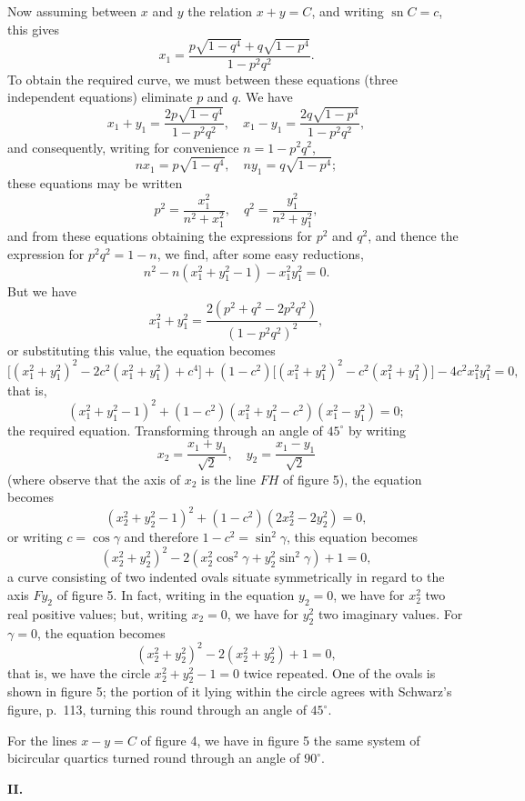 \documentclass[11pt,a4paper]{book}
\begin{document}
{{{Now assuming between $x$ and $y$ the relation $x + y = C$, and writing $\operatorname{sn} C = c$, this gives
\[
x_1 = \frac{p\sqrt{1-q^4} + q\sqrt{1-p^4}}{1-p^2q^2}.
\]
To obtain the required curve, we must between these equations (three independent
equations) eliminate $p$ and $q$. We have
\[
x_1 + y_1 = \frac{2p\sqrt{1-q^4}}{1-p^2q^2},
\quad
x_1 - y_1 = \frac{2q\sqrt{1-p^4}}{1-p^2q^2},
\]
and consequently, writing for convenience $n = 1 - p^2q^2$,
\[
nx_1 = p\sqrt{1-q^4}, \quad ny_1 = q\sqrt{1-p^4};
\]
these equations may be written
\[
p^2 = \frac{x_1^2}{n^2 + x_1^2}, \quad q^2 = \frac{y_1^2}{n^2 + y_1^2},
\]
and from these equations obtaining the expressions for $p^2$ and $q^2$, and thence the
expression for $p^2q^2 = 1 - n$, we find, after some easy reductions,
\[
n^2 - n(x_1^2 + y_1^2 - 1) - x_1^2y_1^2 = 0.
\]
But we have
\[
x_1^2 + y_1^2 = \frac{2(p^2 + q^2 - 2p^2q^2)}{(1-p^2q^2)^2},
\]
or substituting this value, the equation becomes
\[
\bigl[(x_1^2 + y_1^2)^2 - 2c^2(x_1^2 + y_1^2) + c^4\bigr] + (1-c^2)\bigl[(x_1^2 + y_1^2)^2 - c^2(x_1^2 + y_1^2)\bigr] - 4c^2x_1^2y_1^2 = 0,
\]
that is,
\[
(x_1^2 + y_1^2 - 1)^2 + (1-c^2)(x_1^2 + y_1^2 - c^2)(x_1^2 - y_1^2) = 0;
\]
the required equation. Transforming through an angle of $45^\circ$ by writing
\[
x_2 = \frac{x_1 + y_1}{\sqrt{2}}, \quad y_2 = \frac{x_1 - y_1}{\sqrt{2}}
\]
(where observe that the axis of $x_2$ is the line $FH$ of figure 5), the equation becomes
\[
(x_2^2 + y_2^2 - 1)^2 + (1-c^2)(2x_2^2 - 2y_2^2) = 0,
\]
or writing $c = \cos\gamma$ and therefore $1 - c^2 = \sin^2\gamma$, this equation becomes
\[
(x_2^2 + y_2^2)^2 - 2(x_2^2\cos^2\gamma + y_2^2\sin^2\gamma) + 1 = 0,
\]
a curve consisting of two indented ovals situate symmetrically in regard to the axis
$Fy_2$ of figure 5. In fact, writing in the equation $y_2 = 0$, we have for $x_2^2$ two real
positive values; but, writing $x_2 = 0$, we have for $y_2^2$ two imaginary values. For $\gamma=0$,
the equation becomes
\[
(x_2^2 + y_2^2)^2 - 2(x_2^2 + y_2^2) + 1 = 0,
\]
that is, we have the circle $x_2^2 + y_2^2 - 1 = 0$ twice repeated. One of the ovals is
shown in figure 5; the portion of it lying within the circle agrees with Schwarz's
figure, p.~113, turning this round through an angle of $45^\circ$.

For the lines $x - y = C$ of figure 4, we have in figure 5 the same system of
bicircular quartics turned round through an angle of $90^\circ$.

\bigskip
\textbf{II.}

}}}
\end{document}
